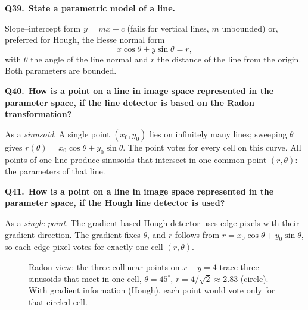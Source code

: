 \documentclass[11pt,a4paper]{article}
\newcommand{\keep}[1]{\par
  \ifdim\dimexpr\pagegoal-\pagetotal\relax<#1\relax\newpage\fi}
\newcommand{\q}[2]{\keep{2.5cm}\medskip
  {\sffamily\bfseries\color{questc}Q#1.}\ {\sffamily\bfseries #2}\par}
\begin{document}
\q{39}{State a parametric model of a line.}
Slope--intercept form $y = mx + c$ (fails for vertical lines, $m$ unbounded)
or, preferred for Hough, the Hesse normal form
\[
  x\cos\theta + y\sin\theta = r,
\]
\noindent
with $\theta$ the angle of the line normal and $r$ the distance of the line from
the origin. Both parameters are bounded.

\q{40}{How is a point on a line in image space represented in the parameter
space, if the line detector is based on the Radon transformation?}
As a \emph{sinusoid}. A single point $(x_0,y_0)$ lies on infinitely many lines;
sweeping $\theta$ gives $r(\theta) = x_0\cos\theta + y_0\sin\theta$. The point
votes for every cell on this curve. All points of one line produce sinusoids
that intersect in one common point $(r,\theta)$: the parameters of that line.

\q{41}{How is a point on a line in image space represented in the parameter
space, if the Hough line detector is used?}
As a \emph{single point}. The gradient-based Hough detector uses edge pixels
with their gradient direction. The gradient fixes $\theta$, and $r$ follows from
$r = x_0\cos\theta + y_0\sin\theta$, so each edge pixel votes for exactly one
cell $(r,\theta)$.

\begin{figure}[ht]
\centering
{}
\caption{Radon view: the three collinear points on $x+y=4$ trace three sinusoids
that meet in one cell, $\theta=45^\circ$, $r=4/\sqrt2\approx2.83$ (circle). With
gradient information (Hough), each point would vote only for that circled cell.}
\end{figure}
\end{document}
